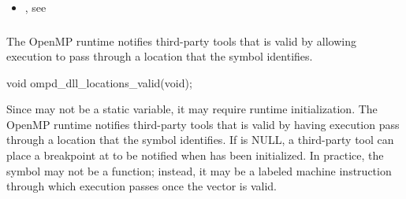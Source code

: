 \crossreferences
\begin{itemize}
\item   {}, 
see 
\end{itemize}



\subsubsection{}
\label{subsubsec:ompd_dll_locations_valid}

\summary
The OpenMP runtime notifies third-party tools that 
is valid by allowing execution to pass through a location that the symbol 
 identifies.

\format
\begin{cspecific}
\begin{ompSyntax}
void ompd_dll_locations_valid(void);
\end{ompSyntax}
\end{cspecific}

\descr
Since  may not be a static variable, it may require
runtime initialization. The OpenMP runtime notifies third-party tools that 
 is valid by having execution pass through a location 
that the symbol  identifies. If 
 is NULL, a third-party tool can place a breakpoint 
at  to be notified when  
has been initialized. In practice, the symbol  
may not be a function; instead, it may be a labeled machine instruction through
which execution passes once the vector is valid.

